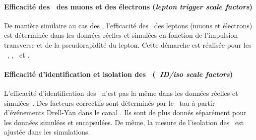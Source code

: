 \paragraph{Efficacité des \HLTpaths\ des muons et des électrons (\emph{lepton trigger scale factors})}
De manière similaire au cas des \tauh, l'efficacité des \HLTpaths\ des leptons (muons et électrons) est déterminée dans les données réelles et simulées en fonction de l'impulsion transverse et de la pseudorapidité du lepton.
Cette démarche est réalisée pour les \HLTpaths\ \HLTSingleMu, \HLTSingleEle, \HLTMuTauCross\ et \HLTEleTauCross.
\paragraph{Efficacité d'identification et isolation des \tauh\ (\emph{\tauh\ ID/iso scale factors})}
L'efficacité d'identification des \tauh\ n'est pas la même dans les données réelles et simulées~\cite{TauPOG}.
Des facteurs correctifs sont déterminés par le \POG\ tau à partir d'événements Drell-Yan dans le canal \mu\tauh.
Ils sont de plus donnés séparément pour les données simulées et encapsulées.
De même, la mesure de l'isolation des \tauh\ est ajustée dans les simulations.

